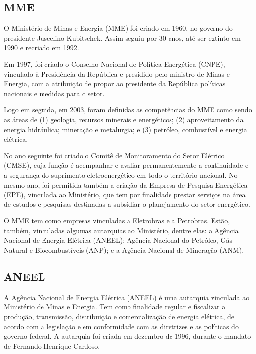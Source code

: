 \documentclass[grad,numbers]{coppe}
\begin{document}
  \hypertarget{mme}{%
  \subsection{MME}\label{mme}}

  O Ministério de Minas e Energia (MME) foi criado em 1960, no governo do presidente Juscelino Kubitschek. Assim seguiu por 30 anos, até ser extinto em 1990 e recriado em 1992.

  Em 1997, foi criado o Conselho Nacional de Política Energética (CNPE), vinculado à Presidência da República e presidido pelo ministro de Minas e Energia, com a atribuição de propor ao presidente da República políticas nacionais e medidas para o setor.

  Logo em seguida, em 2003, foram definidas as competências do MME como sendo as áreas de (1) geologia, recursos minerais e energéticos; (2) aproveitamento da energia hidráulica; mineração e metalurgia; e (3) petróleo, combustível e energia elétrica.

  No ano seguinte foi criado o Comitê de Monitoramento do Setor Elétrico (CMSE), cuja função é acompanhar e avaliar permanentemente a continuidade e a segurança do suprimento eletroenergético em todo o território nacional. No mesmo ano, foi permitida também a criação da Empresa de Pesquisa Energética (EPE), vinculada ao Ministério, que tem por finalidade prestar serviços na área de estudos e pesquisas destinadas a subsidiar o planejamento do setor energético.

  O MME tem como empresas vinculadas a Eletrobras e a Petrobras. Estão, também, vinculadas algumas autarquias ao Ministério, dentre elas: a Agência Nacional de Energia Elétrica (ANEEL); Agência Nacional do Petróleo, Gás Natural e Biocombustíveis (ANP); e a Agência Nacional de Mineração (ANM).

  \hypertarget{aneel}{%
  \subsection{ANEEL}\label{aneel}}

  A Agência Nacional de Energia Elétrica (ANEEL) é uma autarquia vinculada ao Ministério de Minas e Energia. Tem como finalidade regular e fiscalizar a produção, transmissão, distribuição e comercialização de energia elétrica, de acordo com a legislação e em conformidade com as diretrizes e as políticas do governo federal. A autarquia foi criada em dezembro de 1996, durante o mandato de Fernando Henrique Cardoso.
\end{document}
